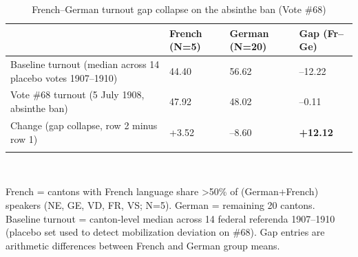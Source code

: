 \begin{table}[tbp] \centering
{}

\caption{French--German turnout gap collapse on the absinthe ban (Vote \#68)}
\label{tab:T6_turnout_gap}
\begin{tabularx}{\linewidth}{@{}lCCC@{}}

\toprule
{ }&{French (N=5)}&{German (N=20)}&{Gap (Fr--Ge)} \tabularnewline
\midrule \addlinespace[\belowrulesep]
Baseline turnout (median across 14 placebo votes 1907--1910)&44.40&56.62&--12.22 \tabularnewline
Vote \#68 turnout (5 July 1908, absinthe ban)&47.92&48.02&--0.11 \tabularnewline
Change (gap collapse, row 2 minus row 1)&+3.52&--8.60&\textbf{+12.12} \tabularnewline
\bottomrule \addlinespace[\belowrulesep]

\end{tabularx}
\\ \parbox{\linewidth}{\footnotesize French = cantons with French language share >50\% of (German+French) speakers (NE, GE, VD, FR, VS; N=5). German = remaining 20 cantons. Baseline turnout = canton-level median across 14 federal referenda 1907--1910 (placebo set used to detect mobilization deviation on \#68). Gap entries are arithmetic differences between French and German group means.}
\end{table}

